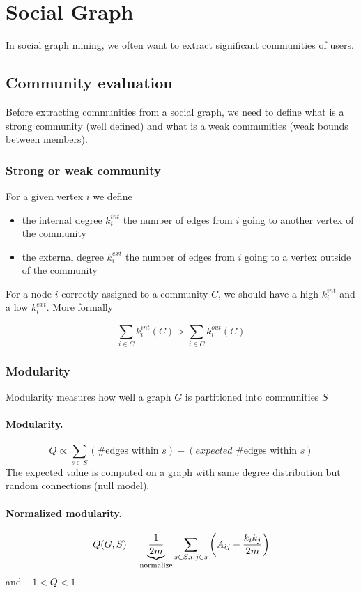 
\section{Social Graph}

In social graph mining, we often want to extract significant communities of users.

\subsection{Community evaluation}

Before extracting communities from a social graph, we need to define what is a strong community (well defined) and what is a weak communities (weak bounds between members).

\subsubsection{Strong or weak community}

For a given vertex $i$ we define
\begin{itemize}
  \item the internal degree $k_i^{int}$ the number of edges from $i$ going to another vertex of the community
  \item the external degree $k_i^{ext}$ the number of edges from $i$ going to a vertex outside of the community
\end{itemize}

For a node $i$ correctly assigned to a community $C$, we should have a high $k_i^{int}$ and a low $k_i^{ext}$. More formally

\[
  \sum_{i\in C} k_i^{int}(C) > \sum_{i\in C} k_i^{out}(C)
\]

\subsubsection{Modularity}

Modularity measures how well a graph $G$ is partitioned into communities $S$

\paragraph{Modularity.}
  \[
    Q \propto \sum_{s \in S} (\text{\# edges within } s) - (expected \text{ \# edges within } s)
  \]
  The expected value is computed on a graph with same degree distribution but random connections (null model).


\paragraph{Normalized modularity.}
  \[
    Q(G,S) = \underbrace{\frac 1 {2m}}_{\text{normalize}} \sum_{s\in S, i,j\in s} \left(A_{ij} - \frac{k_ik_j}{2m}\right)
  \]
  and $-1<Q<1$


